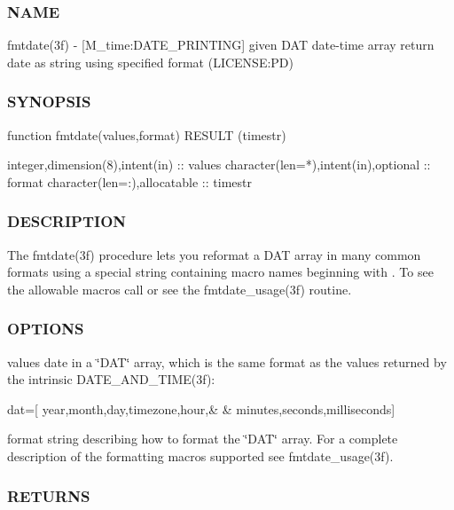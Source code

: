 \subsubsection*{N\+A\+ME}

fmtdate(3f) -\/ \mbox{[}M\+\_\+time\+:D\+A\+T\+E\+\_\+\+P\+R\+I\+N\+T\+I\+NG\mbox{]} given D\+AT date-\/time array return date as string using specified format (L\+I\+C\+E\+N\+SE\+:PD) 

\subsubsection*{S\+Y\+N\+O\+P\+S\+IS}

\begin{DoxyVerb}function fmtdate(values,format) RESULT (timestr)

 integer,dimension(8),intent(in)      :: values
 character(len=*),intent(in),optional :: format
 character(len=:),allocatable         :: timestr
\end{DoxyVerb}


\subsubsection*{D\+E\+S\+C\+R\+I\+P\+T\+I\+ON}

The fmtdate(3f) procedure lets you reformat a D\+AT array in many common formats using a special string containing macro names beginning with \textquotesingle{}\textquotesingle{}. To see the allowable macros call or see the fmtdate\+\_\+usage(3f) routine.

\subsubsection*{O\+P\+T\+I\+O\+NS}

values date in a \char`\"{}\+D\+A\+T\char`\"{} array, which is the same format as the values returned by the intrinsic D\+A\+T\+E\+\_\+\+A\+N\+D\+\_\+\+T\+I\+M\+E(3f)\+:

dat=\mbox{[} year,month,day,timezone,hour,\& \& minutes,seconds,milliseconds\mbox{]}

format string describing how to format the \char`\"{}\+D\+A\+T\char`\"{} array. For a complete description of the formatting macros supported see fmtdate\+\_\+usage(3f). \subsubsection*{R\+E\+T\+U\+R\+NS}

